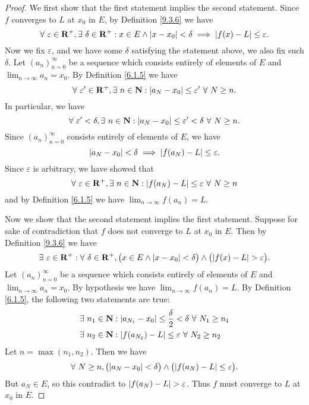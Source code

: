 \begin{proof}
    We first show that the first statement implies the second statement.
    Since \(f\) converges to \(L\) at \(x_0\) in \(E\), by Definition \ref{9.3.6} we have
    \[
        \forall\ \varepsilon \in \mathbf{R}^+, \exists\ \delta \in \mathbf{R}^+ : x \in E \land \abs*{x - x_0} < \delta \implies \abs*{f(x) - L} \leq \varepsilon.
    \]
    Now we fix \(\varepsilon\), and we have some \(\delta\) satisfying the statement above, we also fix such \(\delta\).
    Let \((a_n)_{n = 0}^\infty\) be a sequence which consists entirely of elements of \(E\) and \(\lim_{n \to \infty} a_n = x_0\).
    By Definition \ref{6.1.5} we have
    \[
        \forall\ \varepsilon' \in \mathbf{R}^+, \exists\ n \in \mathbf{N} : \abs*{a_N - x_0} \leq \varepsilon' \ \forall\ N \geq n.
    \]
    In particular, we have
    \[
        \forall\ \varepsilon' < \delta, \exists\ n \in \mathbf{N} : \abs*{a_N - x_0} \leq \varepsilon' < \delta \ \forall\ N \geq n.
    \]
    Since \((a_n)_{n = 0}^\infty\) consists entirely of elements of \(E\), we have
    \[
        \abs*{a_N - x_0} < \delta \implies \abs*{f(a_N) - L} \leq \varepsilon.
    \]
    Since \(\varepsilon\) is arbitrary, we have showed that
    \[
        \forall\ \varepsilon \in \mathbf{R}^+, \exists\ n \in \mathbf{N} : \abs*{f(a_N) - L} \leq \varepsilon \ \forall\ N \geq n
    \]
    and by Definition \ref{6.1.5} we have \(\lim_{n \to \infty} f(a_n) = L\).

    Now we show that the second statement implies the first statement.
    Suppose for sake of contradiction that \(f\) does not converge to \(L\) at \(x_0\) in \(E\).
    Then by Definition \ref{9.3.6} we have
    \[
        \exists\ \varepsilon \in \mathbf{R}^+ : \forall\ \delta \in \mathbf{R}^+, \big(x \in E \land \abs*{x - x_0} < \delta\big) \land \big(\abs*{f(x) - L} > \varepsilon\big).
    \]
    Let \((a_n)_{n = 0}^\infty\) be a sequence which consists entirely of elements of \(E\) and \(\lim_{n \to \infty} a_n = x_0\).
    By hypothesis we have \(\lim_{n \to \infty} f(a_n) = L\).
    By Definition \ref{6.1.5}, the following two statements are true:
    \begin{align*}
         & \exists\ n_1 \in \mathbf{N} : \abs*{a_{N_1} - x_0} \leq \frac{\delta}{2} < \delta \ \forall\ N_1 \geq n_1 \\
         & \exists\ n_2 \in \mathbf{N} : \abs*{f(a_{N_2}) - L} \leq \varepsilon \ \forall\ N_2 \geq n_2
    \end{align*}
    Let \(n = \max(n_1, n_2)\).
    Then we have
    \[
        \forall\ N \geq n, \big(\abs*{a_N - x_0} < \delta\big) \land \big(\abs*{f(a_N) - L} \leq \varepsilon\big).
    \]
    But \(a_N \in E\), so this contradict to \(\abs*{f(a_N) - L} > \varepsilon\).
    Thus \(f\) must converge to \(L\) at \(x_0\) in \(E\).
\end{proof}

